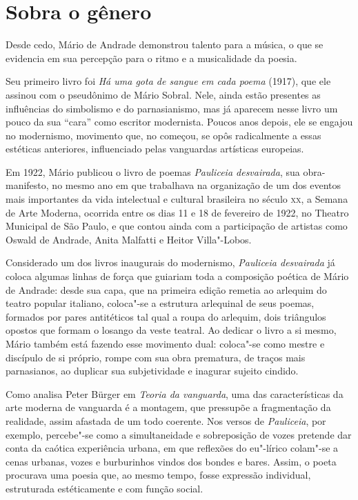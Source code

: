 \section{Sobra o gênero}

Desde cedo, Mário de Andrade demonstrou talento para a música, o que se evidencia em sua percepção para o ritmo e a musicalidade da poesia.

Seu primeiro livro foi \emph{Há uma gota de sangue em cada poema}
(1917), que ele assinou com o pseudônimo de Mário Sobral. Nele, ainda
estão presentes as influências do simbolismo e do parnasianismo, mas já
aparecem nesse livro um pouco da sua ``cara'' como escritor modernista.
Poucos anos depois, ele se engajou no modernismo, movimento que, no
começou, se opôs radicalmente a essas estéticas anteriores, influenciado
pelas vanguardas artísticas europeias.

Em 1922, Mário publicou o livro de poemas \emph{Pauliceia desvairada},
sua obra-manifesto, no mesmo ano em que trabalhava na organização de um
dos eventos mais importantes da vida intelectual e cultural brasileira
no século \textsc{xx}, a Semana de Arte Moderna, ocorrida entre os dias 11 e 18
de fevereiro de 1922, no Theatro Municipal de São Paulo, e que contou
ainda com a participação de artistas como Oswald de Andrade, Anita
Malfatti e Heitor Villa"-Lobos.

Considerado um dos livros inaugurais do modernismo, \emph{Pauliceia desvairada}
já coloca algumas linhas de força que guiariam toda a composição poética de Mário de Andrade: desde sua capa, que na primeira edição remetia ao arlequim do teatro popular italiano, coloca"-se a estrutura arlequinal de seus poemas, formados por pares antitéticos tal qual a roupa do arlequim, dois triângulos opostos que formam o losango da veste teatral. Ao dedicar o livro a si mesmo, Mário também está fazendo esse movimento dual: coloca"-se como mestre e discípulo de si próprio, rompe com sua obra prematura, de traços mais parnasianos, ao duplicar sua subjetividade e inagurar sujeito cindido.

Como analisa Peter Bürger em \textit{Teoria da vanguarda}, uma das características da arte moderna de vanguarda é a montagem, que pressupõe a fragmentação da realidade, assim afastada de um todo coerente. Nos versos de \textit{Pauliceia}, por exemplo, percebe"-se como a simultaneidade e sobreposição de vozes pretende dar conta da caótica experiência urbana, em que reflexões do eu"-lírico colam"-se a cenas urbanas, vozes e burburinhos vindos dos bondes e bares.
Assim, o poeta procurava uma poesia que, ao mesmo tempo, fosse expressão individual, estruturada estéticamente e com função social.

